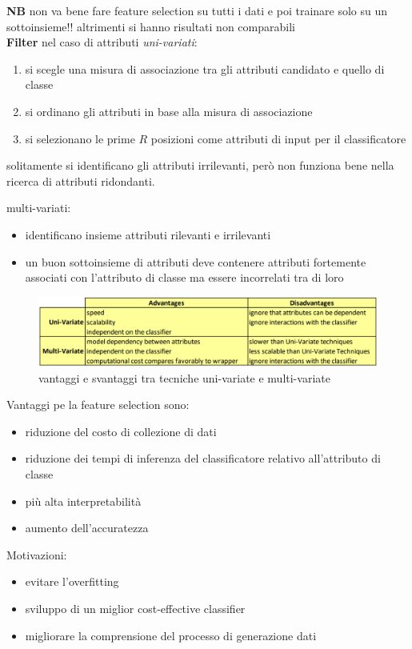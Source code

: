 \textbf{NB} non va bene fare feature selection su tutti i dati e poi trainare solo su un sottoinsieme!! altrimenti si hanno risultati non comparabili
\\
\textbf{Filter} nel caso di attributi \textit{uni-variati}: 
\begin{enumerate}
	\item si scegle una misura di associazione tra gli attributi candidato e quello di classe
	\item si ordinano gli attributi in base alla misura di associazione
	\item si selezionano le prime $R$ posizioni come attributi di input per il classificatore
\end{enumerate}
solitamente si identificano gli attributi irrilevanti, per\`o non funziona bene nella ricerca di attributi ridondanti.

multi-variati:
\begin{itemize}
	\item identificano insieme attributi rilevanti e irrilevanti
	\item un buon sottoinsieme di attributi deve contenere attributi fortemente associati con l'attributo di classe ma essere incorrelati tra di loro
\end{itemize}

\begin{figure}[h!]
	\centering
	\includegraphics[height=0.22 \linewidth]{pict/filter_uni_multi.png}
	\caption{vantaggi e svantaggi tra tecniche uni-variate e multi-variate}
\end{figure}

Vantaggi pe la feature selection sono:
\begin{itemize}
	\item riduzione del costo di collezione di dati
	\item riduzione dei tempi di inferenza del classificatore relativo all'attributo di classe
	\item pi\`u alta interpretabilit\`a
	\item aumento dell'accuratezza
\end{itemize}
Motivazioni:
\begin{itemize}
	\item evitare l'overfitting
	\item sviluppo di un miglior cost-effective classifier
	\item migliorare la comprensione del processo di generazione dati
\end{itemize}

